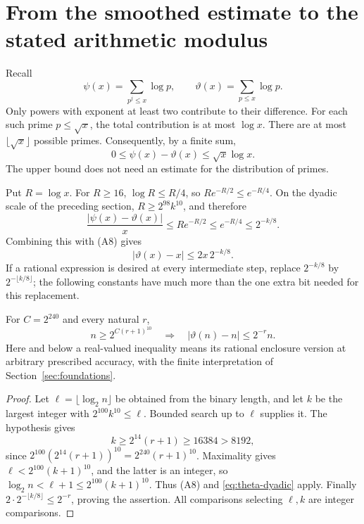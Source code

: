 \section{From the smoothed estimate to the stated arithmetic modulus}
\label{sec:theta-bridge}

Recall
\[
 \psi(x)=\sum_{p^j\le x}\log p,
 \qquad \vartheta(x)=\sum_{p\le x}\log p.
\]
Only powers with exponent at least two contribute to their difference.
For each such prime $p\le\sqrt x$, the total contribution is at most
$\log x$. There are at most $\lfloor\sqrt x\rfloor$ possible primes.
Consequently, by a finite sum,
\begin{equation}\label{eq:prime-powers-gap}
 0\le\psi(x)-\vartheta(x)\le\sqrt x\log x.
\end{equation}
The upper bound does not need an estimate for the distribution of primes.

Put $R=\log x$. For $R\ge16$, $\log R\le R/4$, so
$R e^{-R/2}\le e^{-R/4}$. On the dyadic scale of the preceding
section, $R\ge2^{98}k^{10}$, and therefore
\[
 \frac{|\psi(x)-\vartheta(x)|}{x}
 \le R e^{-R/2}\le e^{-R/4}\le2^{-k/8}.
\]
Combining this with (A8) gives
\begin{equation}\label{eq:theta-dyadic}
 |\vartheta(x)-x|\le2x\,2^{-k/8}.
\end{equation}
If a rational expression is desired at every intermediate step, replace
$2^{-k/8}$ by $2^{-\lfloor k/8\rfloor}$; the following constants have
much more than the one extra bit needed for this replacement.

\begin{theorem}
\label{thm:theta-modulus-established}
For $C=2^{240}$ and every natural $r$,
\begin{equation}\label{eq:theta-established}
 n\ge2^{C(r+1)^{10}}
 \quad\Longrightarrow\quad
 |\vartheta(n)-n|\le2^{-r}n.
\end{equation}
Here and below a real-valued inequality means its rational enclosure
version at arbitrary prescribed accuracy, with the finite interpretation
of Section~\ref{sec:foundations}.
\end{theorem}

\begin{proof}
Let $\ell=\lfloor\log_2n\rfloor$ be obtained from the binary length,
and let $k$ be the largest integer with $2^{100}k^{10}\le\ell$.
Bounded search up to $\ell$ supplies it. The hypothesis gives
\[
 k\ge2^{14}(r+1)\ge16384>8192,
\]
since $2^{100}(2^{14}(r+1))^{10}=2^{240}(r+1)^{10}$.
Maximality gives $\ell<2^{100}(k+1)^{10}$, and the latter is an
integer, so $\log_2n<\ell+1\le2^{100}(k+1)^{10}$.
Thus (A8) and \eqref{eq:theta-dyadic} apply. Finally
$2\cdot2^{-\lfloor k/8\rfloor}\le2^{-r}$, proving the assertion.
All comparisons selecting $\ell,k$ are integer comparisons.
\end{proof}

